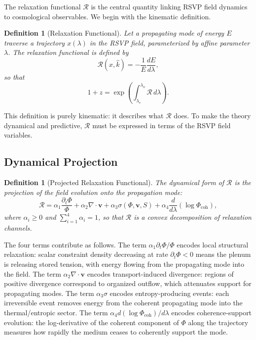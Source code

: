 \documentclass[12pt,a4paper]{article}
\newtheorem{definition}[theorem]{Definition}
\theoremstyle{remark}
\newcommand{\vv}{\mathbf{v}}
\newcommand{\Rcal}{\mathcal{R}}
\begin{document}
The relaxation functional $\Rcal$ is the central quantity linking RSVP field dynamics to cosmological observables. We begin with the kinematic definition.

\begin{definition}[Relaxation Functional]
Let a propagating mode of energy $E$ traverse a trajectory $x(\lambda)$ in the RSVP field, parameterized by affine parameter $\lambda$. The relaxation functional is defined by
\begin{equation}
\boxed{\Rcal(x, \hat{k}) = -\frac{1}{E}\frac{dE}{d\lambda},}
\label{eq:R_kinematic}
\end{equation}
so that
\begin{equation}
1 + z = \exp\!\left(\int_{\lambda_e}^{\lambda_o} \Rcal\, d\lambda\right).
\label{eq:redshift_R}
\end{equation}
\end{definition}

This definition is purely kinematic: it describes what $\Rcal$ does. To make the theory dynamical and predictive, $\Rcal$ must be expressed in terms of the RSVP field variables.

\subsection{Dynamical Projection}

\begin{definition}[Projected Relaxation Functional]
The dynamical form of $\Rcal$ is the projection of the field evolution onto the propagation mode:
\begin{equation}
\boxed{\Rcal = \alpha_1 \frac{\partial_t \Phi}{\Phi} + \alpha_2 \nabla \cdot \vv + \alpha_3 \sigma(\Phi, \vv, S) + \alpha_4 \frac{d}{d\lambda}\!\left(\log \Phi_{\mathrm{coh}}\right),}
\label{eq:R_dynamic}
\end{equation}
where $\alpha_i \ge 0$ and $\sum_{i=1}^4 \alpha_i = 1$, so that $\Rcal$ is a convex decomposition of relaxation channels.
\end{definition}

The four terms contribute as follows. The term $\alpha_1 \partial_t \Phi / \Phi$ encodes local structural relaxation: scalar constraint density decreasing at rate $\partial_t \Phi < 0$ means the plenum is releasing stored tension, with energy flowing from the propagating mode into the field. The term $\alpha_2 \nabla \cdot \vv$ encodes transport-induced divergence: regions of positive divergence correspond to organized outflow, which attenuates support for propagating modes. The term $\alpha_3 \sigma$ encodes entropy-producing events: each irreversible event removes energy from the coherent propagating mode into the thermal/entropic sector. The term $\alpha_4 d(\log \Phi_{\mathrm{coh}})/d\lambda$ encodes coherence-support evolution: the log-derivative of the coherent component of $\Phi$ along the trajectory measures how rapidly the medium ceases to coherently support the mode.
\end{document}
